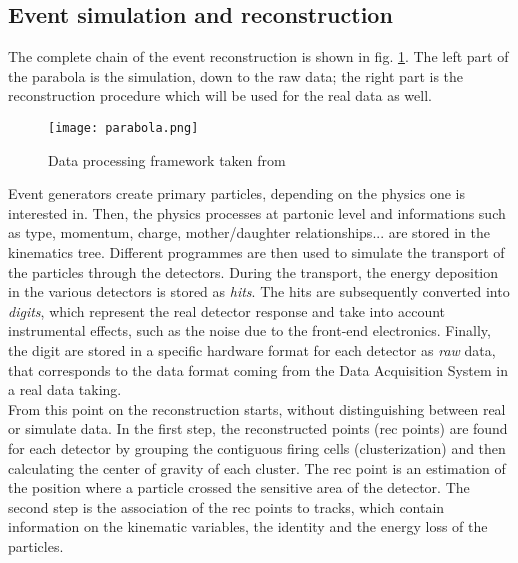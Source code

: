 \subsection{Event simulation and reconstruction}
The complete chain of the event reconstruction is shown in fig. \ref{fig:parabola}. The left part of the parabola is the simulation, down to the raw data; the right part is the reconstruction procedure which will be used for the real data as well. 
\begin{figure}[!b]
\centering
\texttt{[image: parabola.png]}
\caption{Data processing framework taken from \cite{PPR1}}
\label{fig:parabola}
\end{figure}
Event generators create primary particles, depending on the physics one is interested in. Then, the physics processes at partonic level and informations such as type, momentum, charge, mother/daughter relationships... are stored in the kinematics tree. Different programmes are then used to simulate the transport of the particles through the detectors. During the transport, the energy deposition in the various detectors is stored as \textit{hits}. The hits are subsequently converted into \textit{digits}, which represent the real detector response and take into account instrumental effects, such as the noise due to the front-end electronics. Finally, the digit are stored in a specific hardware format for each detector as \textit{raw} data, that corresponds to the data format coming from the Data Acquisition System in a real data taking. \\From this point on the reconstruction starts, without distinguishing between real or simulate data. In the first step, the reconstructed points (rec points) are found for each detector by grouping the contiguous firing cells (clusterization) and then calculating the center of gravity of each cluster. The rec point is an estimation of the position where a particle crossed the sensitive area of the detector. The second step is the association of the rec points to tracks, which contain information on the kinematic variables, the identity and the energy loss of the particles. 

